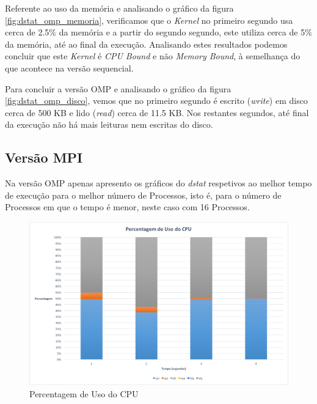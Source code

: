 \documentclass[conference,compsoc]{IEEEtran}
\begin{document}
Referente ao uso da memória e analisando o gráfico da figura \ref{fig:dstat_omp_memoria}, verificamos que o \textit{Kernel} no primeiro segundo usa cerca de 2.5\% da memória e a partir do segundo segundo, este utiliza cerca de 5\% da memória, até ao final da execução. Analisando estes resultados podemos concluir que este \textit{Kernel} é \textit{CPU Bound} e não \textit{Memory Bound}, à semelhança do que acontece na versão sequencial.

Para concluir a versão OMP e analisando o gráfico da figura \ref{fig:dstat_omp_disco}, vemos que no primeiro segundo é escrito (\textit{write}) em disco cerca de 500 KB e lido (\textit{read}) cerca de 11.5 KB. Nos restantes segundos, até final da execução não há mais leituras nem escritas do disco. 

\subsection{Versão MPI}
Na versão OMP apenas apresento os gráficos do \textit{dstat} respetivos ao melhor tempo de execução para o melhor número de Processos, isto é, para o número de Processos em que o tempo é menor, neste caso com 16 Processos.

\begin{figure}[h!]
\centering
\includegraphics[scale=0.325]{dstat/MPI/dstat_mpi_cpu.png}
\caption{Percentagem de Uso do CPU}
\label{fig:dstat_mpi_cpu}
\end{figure}
\end{document}
